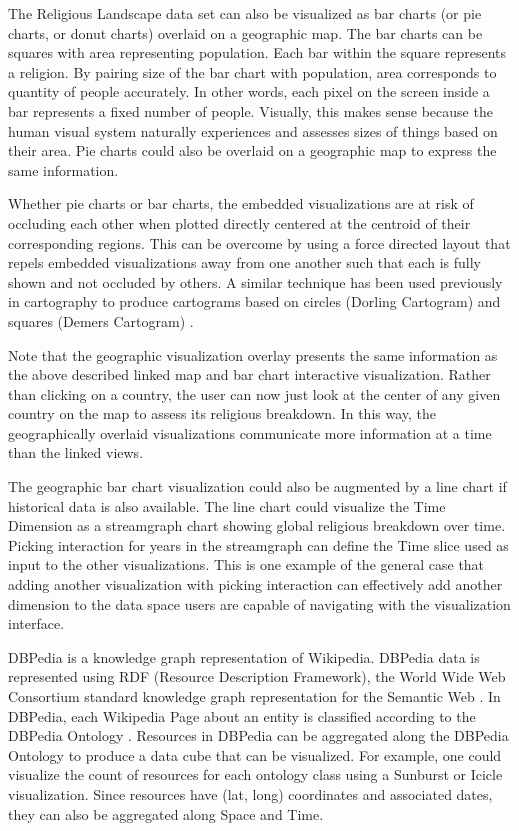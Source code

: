 The Religious Landscape data set can also be visualized as bar charts (or pie charts, or donut charts) overlaid on a geographic map. The bar charts can be squares with area representing population. Each bar within the square represents a religion. By pairing size of the bar chart with population, area corresponds to quantity of people accurately. In other words, each pixel on the screen inside a bar represents a fixed number of people. Visually, this makes sense because the human visual system naturally experiences and assesses sizes of things based on their area. \cite{tufte1983visual} Pie charts could also be overlaid on a geographic map to express the same information.

Whether pie charts or bar charts, the embedded visualizations are at risk of occluding each other when plotted directly centered at the centroid of their corresponding regions. This can be overcome by using a force directed layout that repels embedded visualizations away from one another such that each is fully shown and not occluded by others. A similar technique has been used previously in cartography to produce cartograms based on circles (Dorling Cartogram) and squares (Demers Cartogram) \cite{tobler2004thirty}.

Note that the geographic visualization overlay presents the same information as the above described linked map and bar chart interactive visualization. Rather than clicking on a country, the user can now just look at the center of any given country on the map to assess its religious breakdown. In this way, the geographically overlaid visualizations communicate more information at a time than the linked views. 

The geographic bar chart visualization could also be augmented by a line chart if historical data is also available. The line chart could visualize the Time Dimension as a streamgraph chart showing global religious breakdown over time. Picking interaction for years in the streamgraph can define the Time slice used as input to the other visualizations. This is one example of the general case that adding another visualization with picking interaction can effectively add another dimension to the data space users are capable of navigating with the visualization interface.


%
%
%
%
%
%



DBPedia is a knowledge graph representation of Wikipedia. DBPedia data is represented using RDF (Resource Description Framework), the World Wide Web Consortium standard knowledge graph representation for the Semantic Web \cite{klyne2006resource}. In DBPedia, each Wikipedia Page about an entity is classified according to the DBPedia Ontology \cite{bizer2009dbpedia}. Resources in DBPedia can be aggregated along the DBPedia Ontology to produce a data cube that can be visualized. For example, one could visualize the count of resources for each ontology class using a Sunburst or Icicle visualization. Since resources have (lat, long) coordinates and associated dates, they can also be aggregated along Space and Time.

